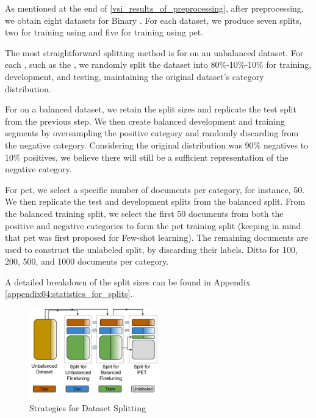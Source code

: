 \label{06_splitting_the_dataset}

As mentioned at the end of \headerName{} \ref{vsi_results_of_preprocessing}, after preprocessing, we obtain eight datasets for Binary \textclassification{}. For each dataset, we produce seven splits, two for training using \finetuning{} and five for training using \gls{pet}.


The most straightforward splitting method is for \finetuning{} on an unbalanced dataset. For each \contentType{}, such as the \translationTitle{}, we randomly split the dataset into 80\%-10\%-10\% for training, development, and testing, maintaining the original dataset's category distribution.

For \finetuning{} on a balanced dataset, we retain the split sizes and replicate the test split from the previous step. 
We then create balanced development and training segments by oversampling the positive category and randomly discarding from the negative category. Considering the original distribution was 90\% negatives to 10\% positives, we believe there will still be a sufficient representation of the negative category.

For \gls{pet}, we select a specific number of documents per category, for instance, 50. We then replicate the test and development splits from the balanced \finetuning{} split. From the balanced \finetuning{} training split, we select the first 50 documents from both the positive and negative categories to form the \gls{pet} training split (keeping in mind that \gls{pet} was first proposed for Few-shot learning). The remaining documents are used to construct the unlabeled split, by discarding their labels. Ditto for 100, 200, 500, and 1000 documents per category.

A detailed breakdown of the split sizes can be found in Appendix \ref{appendix04:statistics_for_splits}.



\begin{figure}
    \centering
    \includegraphics[width=0.5\textwidth]{Figures/06/06_dataset_splits.png}
    \caption{Strategies for Dataset Splitting}
    \label{fig:06_strategies_for_dataset_splitting}
\end{figure}